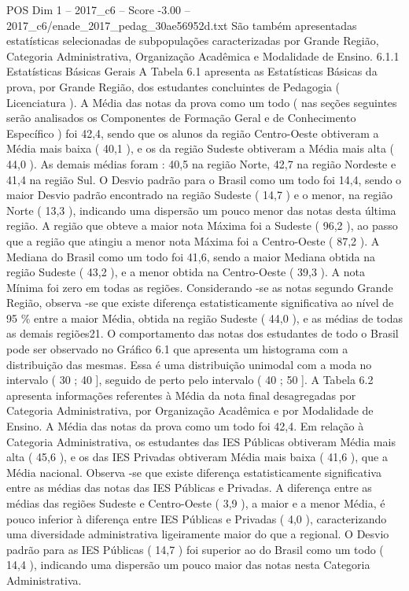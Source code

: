 \begin{textsample}{POS Dim 1 – 2017\_c6 – Score -3.00 – 2017\_c6/enade\_2017\_pedag\_30ae56952d.txt}
São também apresentadas estatísticas selecionadas de subpopulações caracterizadas por Grande Região, Categoria Administrativa, Organização Acadêmica e Modalidade de Ensino. 6.1.1 Estatísticas Básicas Gerais A Tabela 6.1 apresenta as Estatísticas Básicas da prova, por Grande Região, dos estudantes concluintes de Pedagogia ( Licenciatura ).
A Média das notas da prova como um todo ( nas seções seguintes serão analisados os Componentes de Formação Geral e de Conhecimento Específico ) foi 42,4, sendo que os alunos da região Centro-Oeste obtiveram a Média mais baixa ( 40,1 ), e os da região Sudeste obtiveram a Média mais alta ( 44,0 ).
As demais médias foram : 40,5 na região Norte, 42,7 na região Nordeste e 41,4 na região Sul.
O Desvio padrão para o Brasil como um todo foi 14,4, sendo o maior Desvio padrão encontrado na região Sudeste ( 14,7 ) e o menor, na região Norte ( 13,3 ), indicando uma dispersão um pouco menor das notas desta última região.
A região que obteve a maior nota Máxima foi a Sudeste ( 96,2 ), ao passo que a região que atingiu a menor nota Máxima foi a Centro-Oeste ( 87,2 ).
A Mediana do Brasil como um todo foi 41,6, sendo a maior Mediana obtida na região Sudeste ( 43,2 ), e a menor obtida na Centro-Oeste ( 39,3 ).
A nota Mínima foi zero em todas as regiões.
Considerando -se as notas segundo Grande Região, observa -se que existe diferença estatisticamente significativa ao nível de 95 \% entre a maior Média, obtida na região Sudeste ( 44,0 ), e as médias de todas as demais regiões21.
O comportamento das notas dos estudantes de todo o Brasil pode ser observado no Gráfico 6.1 que apresenta um histograma com a distribuição das mesmas.
Essa é uma distribuição unimodal com a moda no intervalo ( 30 ; 40 ], seguido de perto pelo intervalo ( 40 ; 50 ].
A Tabela 6.2 apresenta informações referentes à Média da nota final desagregadas por Categoria Administrativa, por Organização Acadêmica e por Modalidade de Ensino.
A Média das notas da prova como um todo foi 42,4.
Em relação à Categoria Administrativa, os estudantes das IES Públicas obtiveram Média mais alta ( 45,6 ), e os das IES Privadas obtiveram Média mais baixa ( 41,6 ), que a Média nacional.
Observa -se que existe diferença estatisticamente significativa entre as médias das notas das IES Públicas e Privadas.
A diferença entre as médias das regiões Sudeste e Centro-Oeste ( 3,9 ), a maior e a menor Média, é pouco inferior à diferença entre IES Públicas e Privadas ( 4,0 ), caracterizando uma diversidade administrativa ligeiramente maior do que a regional.
O Desvio padrão para as IES Públicas ( 14,7 ) foi superior ao do Brasil como um todo ( 14,4 ), indicando uma dispersão um pouco maior das notas nesta Categoria Administrativa.

\end{textsample}
